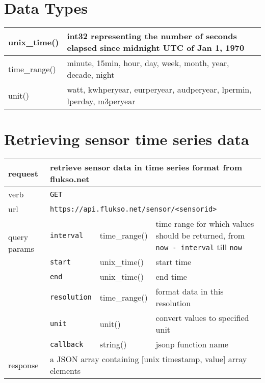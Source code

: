 \section{Data Types}
\begin{tabular}{|l|p{9.5cm}|}

\hline
unix\_time() & int32 representing the number of seconds elapsed since midnight UTC of Jan 1, 1970 \\

\hline
time\_range() & minute, 15min, hour, day, week, month, year, decade, night \\

\hline
unit() & watt, kwhperyear, eurperyear, audperyear, lpermin, lperday, m3peryear \\

\hline

\end{tabular}

\section{Retrieving sensor time series data}
\begin{tabular}{|l|l|l|p{5cm}|}

\hline
request & \multicolumn{3}{|l|}{retrieve sensor data in time series format from flukso.net} \\

\hline
verb & \multicolumn{3}{|l|}{\texttt{GET}} \\

\hline
url & \multicolumn{3}{|l|}{\texttt{https://api.flukso.net/sensor/\textless sensorid\textgreater}} \\

\hline
\multirow{2}{*}{query params} & \texttt{interval} & time\_range() & time range for which values should be returned, from \texttt{now - interval} till \texttt{now} \\
& \texttt{start} & unix\_time() & start time \\
& \texttt{end} & unix\_time() & end time \\
& \texttt{resolution} & time\_range() & format data in this resolution \\
& \texttt{unit} & unit() & convert values to specified unit \\
& \texttt{{\small callback}} & string() & jsonp function name \\

\hline
response & \multicolumn{3}{|l|}{a JSON array containing [unix timestamp, value] array elements} \\

\hline

\end{tabular}

